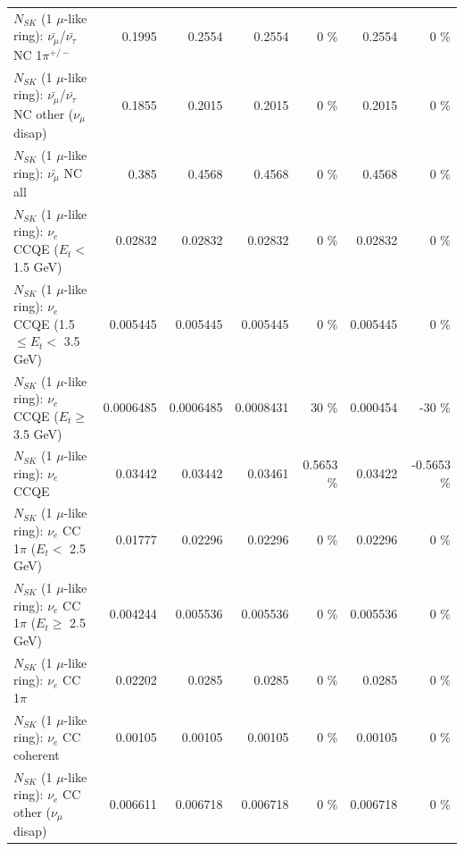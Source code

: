 \begin{table}
\begin{tabular}{| l | r | r | r  r | r  r |}
\hline
  $N_{SK}$ (1 $\mu$-like ring): $\bar{\nu_\mu}$/$\bar{\nu_\tau}$ NC 1$\pi^{+/-}$ &          0.1995 &          0.2554 &          0.2554 &        0 \%  &          0.2554 &        0 \%  \\ 
$N_{SK}$ (1 $\mu$-like ring): $\bar{\nu_\mu}$/$\bar{\nu_\tau}$ NC other ($\nu_\mu$ disap) &          0.1855 &          0.2015 &          0.2015 &        0 \%  &          0.2015 &        0 \%  \\ 
                          $N_{SK}$ (1 $\mu$-like ring): $\bar{\nu_{\mu}}$ NC all &           0.385 &          0.4568 &          0.4568 &        0 \%  &          0.4568 &        0 \%  \\ 
\hline
\hline
\hline
                  $N_{SK}$ (1 $\mu$-like ring): $\nu_e$ CCQE ($E_{t} <$ 1.5 GeV) &         0.02832 &         0.02832 &         0.02832 &        0 \%  &         0.02832 &        0 \%  \\ 
         $N_{SK}$ (1 $\mu$-like ring): $\nu_e$ CCQE (1.5 $\leq E_{t} <$ 3.5 GeV) &        0.005445 &        0.005445 &        0.005445 &        0 \%  &        0.005445 &        0 \%  \\ 
               $N_{SK}$ (1 $\mu$-like ring): $\nu_e$ CCQE ($E_{t} \geq$ 3.5 GeV) &       0.0006485 &       0.0006485 &       0.0008431 &       30 \%  &        0.000454 &      -30 \%  \\ 
\hline
                                      $N_{SK}$ (1 $\mu$-like ring): $\nu_e$ CCQE &         0.03442 &         0.03442 &         0.03461 &   0.5653 \%  &         0.03422 &  -0.5653 \%  \\ 
\hline
             $N_{SK}$ (1 $\mu$-like ring): $\nu_e$ CC 1$\pi$ ($E_{t} <$ 2.5 GeV) &         0.01777 &         0.02296 &         0.02296 &        0 \%  &         0.02296 &        0 \%  \\ 
          $N_{SK}$ (1 $\mu$-like ring): $\nu_e$ CC 1$\pi$ ($E_{t} \geq$ 2.5 GeV) &        0.004244 &        0.005536 &        0.005536 &        0 \%  &        0.005536 &        0 \%  \\ 
\hline
                                 $N_{SK}$ (1 $\mu$-like ring): $\nu_e$ CC 1$\pi$ &         0.02202 &          0.0285 &          0.0285 &        0 \%  &          0.0285 &        0 \%  \\ 
                               $N_{SK}$ (1 $\mu$-like ring): $\nu_e$ CC coherent &         0.00105 &         0.00105 &         0.00105 &        0 \%  &         0.00105 &        0 \%  \\ 
                $N_{SK}$ (1 $\mu$-like ring): $\nu_e$ CC other ($\nu_\mu$ disap) &        0.006611 &        0.006718 &        0.006718 &        0 \%  &        0.006718 &        0 \%  \\ 

\end{tabular}
\end{table}
